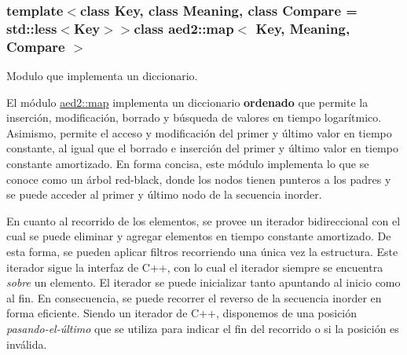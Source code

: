 \subsubsection*{template$<$class \-Key, class \-Meaning, class \-Compare = std\-::less$<$\-Key$>$$>$class aed2\-::map$<$ Key, Meaning, Compare $>$}

\-Modulo que implementa un diccionario. 

\-El módulo \hyperlink{classaed2_1_1map}{aed2\-::map} implementa un diccionario {\bfseries ordenado} que permite la inserción, modificación, borrado y búsqueda de valores en tiempo logarítmico. \-Asimismo, permite el acceso y modificación del primer y último valor en tiempo constante, al igual que el borrado e inserción del primer y último valor en tiempo constante amortizado. \-En forma concisa, este módulo implementa lo que se conoce como un árbol red-\/black, donde los nodos tienen punteros a los padres y se puede acceder al primer y último nodo de la secuencia inorder.

\-En cuanto al recorrido de los elementos, se provee un iterador bidireccional con el cual se puede eliminar y agregar elementos en tiempo constante amortizado. \-De esta forma, se pueden aplicar filtros recorriendo una única vez la estructura. \-Este iterador sigue la interfaz de \-C++, con lo cual el iterador siempre se encuentra {\itshape sobre\/} un elemento. \-El iterador se puede inicializar tanto apuntando al inicio como al fin. \-En consecuencia, se puede recorrer el reverso de la secuencia inorder en forma eficiente. \-Siendo un iterador de \-C++, disponemos de una posición {\itshape pasando-\/el-\/último\/} que se utiliza para indicar el fin del recorrido o si la posición es inválida.


